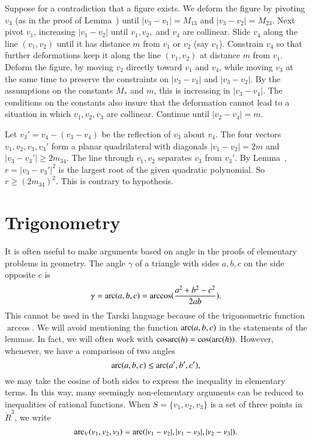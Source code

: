 \begin{tarskidata}
\begin{tarski}

\begin{proved}  Suppose for a contradiction that a figure exists.
We deform the figure by pivoting $v_3$ 
(as in the proof of Lemma~)
until $|v_3-v_1| = M_{13}$ and $|v_3-v_2|=M_{23}$.   Next pivot $v_1$, increasing $|v_1-v_2|$
until $v_1,v_2,$ and $v_4$ are collinear.  Slide $v_4$ along the line $(v_1,v_2)$ until
it has distance $m$ from $v_1$ or $v_2$ (say $v_1$).   Constrain $v_4$ so that further
deformations keep it along the line $(v_1,v_2)$ at distance $m$ from $v_1$.  
Deform the figure, by moving $v_2$ directly toward $v_1$ and $v_4$, while moving
$v_3$ at the same time to preserve the constraints on $|v_3-v_1|$ and $|v_3-v_2|$.  By
the assumptions on the constants $M_*$ and $m$, this is increasing in $|v_3-v_4|$.  The conditions
on the constants also insure that the deformation cannot lead to a situation in which
$v_1,v_2,v_3$ are collinear.  Continue
until $|v_2-v_4|=m$.

Let $v_3' = v_4 - (v_3-v_4)$ be the reflection of $v_3$ about $v_4$.  The four vectors
$v_1,v_2,v_3,v_3'$ form a planar quadrilateral with diagonals $|v_1-v_2|=2m$ and $|v_3-v_3'| \ge 2m_{34}$.
The line through $v_1,v_2$ separates $v_3$ from $v_3'$.  By Lemma~,  
$r = |v_3-v_3'|^2$ is
the largest root of the given quadratic polynomial.  So $r \ge (2 m_{34})^2$.  This is contrary
to hypothesis.
\swallowed\end{proved}
\end{tarski}






\section{Trigonometry}


It is often useful to make arguments based on angle in the proofs
of elementary problems in geometry. The angle $\gamma$
of a triangle with sides
$a,b,c$ on the side opposite $c$ is
    $$
    \gamma = \operatorname{arc}(a,b,c)=\arccos(\frac{a^2 + b^2 - c^2}{2 a b}).
    $$
This cannot be used in the Tarski language because of the trigonometric
function $\arccos$.  We will avoid mentioning the function
$\operatorname{arc}(a,b,c)$ in the statements of the lemmas.
In fact, we will often work with $\operatorname{cosarc}(h) = \cos(\operatorname{arc}(h))$.
However, whenever, we have a comparison of
two angles
    $$
    \operatorname{arc}(a,b,c) \le \operatorname{arc}(a',b',c'),
    $$
we may take the cosine of both sides to express the inequality in
elementary terms.  In this way, many seemingly non-elementary arguments
can be reduced to inequalities of rational functions.  When
$S=\{v_1,v_2,v_3\}$ is a set of three points in $\ring{R}^3$, we write
   $$
   \operatorname{arc}_V(v_1,v_2,v_3) = \operatorname{arc}(|v_1-v_2|,|v_1-v_3|,|v_2-v_3|).
   $$


\end{tarskidata}
